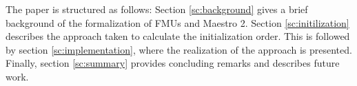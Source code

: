 The paper is structured as follows: Section \ref{sc:background} gives a brief background of the formalization of FMUs and Maestro 2. Section \ref{sc:initilization} describes the approach taken to calculate the initialization order. This is followed by section \ref{sc:implementation}, where the realization of the approach is presented. Finally, section \ref{sc:summary} provides concluding remarks and describes future work.
